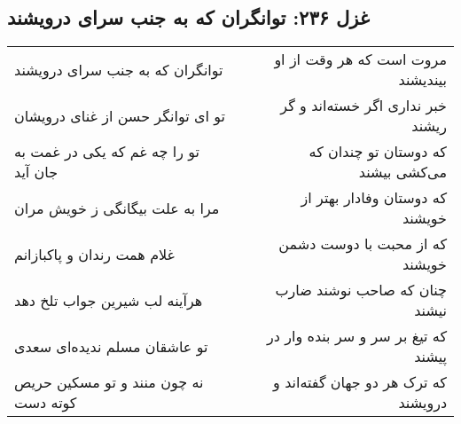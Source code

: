 \begin{center}
\section*{غزل ۲۳۶: توانگران که به جنب سرای درویشند}
\label{sec:236}
\begin{longtable}{l p{0.5cm} r}
توانگران که به جنب سرای درویشند
&&
مروت است که هر وقت از او بیندیشند
\\
تو ای توانگر حسن از غنای درویشان
&&
خبر نداری اگر خسته‌اند و گر ریشند
\\
تو را چه غم که یکی در غمت به جان آید
&&
که دوستان تو چندان که می‌کشی بیشند
\\
مرا به علت بیگانگی ز خویش مران
&&
که دوستان وفادار بهتر از خویشند
\\
غلام همت رندان و پاکبازانم
&&
که از محبت با دوست دشمن خویشند
\\
هرآینه لب شیرین جواب تلخ دهد
&&
چنان که صاحب نوشند ضارب نیشند
\\
تو عاشقان مسلم ندیده‌ای سعدی
&&
که تیغ بر سر و سر بنده وار در پیشند
\\
نه چون منند و تو مسکین حریص کوته دست
&&
که ترک هر دو جهان گفته‌اند و درویشند
\\
\end{longtable}
\end{center}
